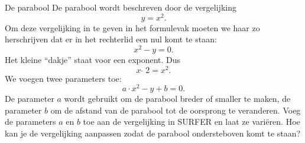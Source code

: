 \begin{surferPage}[Parabool]{De parabool}
De parabool wordt beschreven door de vergelijking  \[y=x^2.\]
Om deze vergelijking in te geven in het formulevak moeten we haar zo herschrijven dat er in het rechterlid een nul komt te staan:
\[x^2-y=0.\]
Het kleine ``dakje'' staat voor een exponent. Dus 
\[ x  \,\hat{\ } \, 2 =x^2.\]
We voegen twee parameters toe:
\[a \cdot x^2-y+b=0.\]
De parameter $a$ wordt gebruikt om de parabool breder of smaller te maken, de parameter $b$ om de afstand van de parabool tot de oorsprong te veranderen.
\newline
Voeg de parameters $a$ en $b$ toe aan de vergelijking in SURFER en laat ze vari\"eren. Hoe kan je de vergelijking aanpassen zodat de parabool ondersteboven komt te staan?
\end{surferPage}
